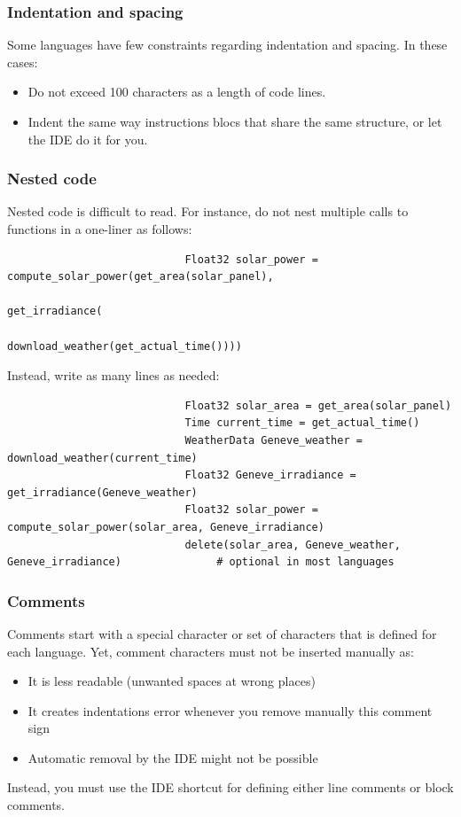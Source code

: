 \documentclass[11pt]{article}
\begin{document}
			\subsubsection{Indentation and spacing}
				Some languages have few constraints regarding indentation and spacing. In these cases:
				\begin{itemize}
					\setlength\itemsep{0pt}
					\item Do not exceed 100 characters as a length of code lines.
					\item Indent the same way instructions blocs that share the same structure, or let the IDE do it for you.
				\end{itemize}

			\subsubsection{Nested code}
				Nested code is difficult to read. For instance, do not nest multiple calls to functions in a one-liner as follows:
				\begin{verbatim}
							Float32 solar_power = compute_solar_power(get_area(solar_panel),
																	  get_irradiance(
																		             download_weather(get_actual_time())))
				\end{verbatim}
				Instead, write as many lines as needed:
				\begin{verbatim}
							Float32 solar_area = get_area(solar_panel)
                            Time current_time = get_actual_time()
							WeatherData Geneve_weather = download_weather(current_time)
							Float32 Geneve_irradiance = get_irradiance(Geneve_weather)
							Float32 solar_power = compute_solar_power(solar_area, Geneve_irradiance)
							delete(solar_area, Geneve_weather, Geneve_irradiance)               # optional in most languages
				\end{verbatim}


			\subsubsection{Comments}
                Comments start with a special character or set of characters that is defined for each language. Yet, 
                comment characters must not be inserted manually as:
				\begin{itemize}
					\setlength\itemsep{0pt}
					\item It is less readable (unwanted spaces at wrong places)
					\item It creates indentations error whenever you remove manually this comment sign
					\item Automatic removal by the IDE might not be possible
				\end{itemize}
                Instead, you must use the IDE shortcut for defining either line comments or block comments.
\end{document}
